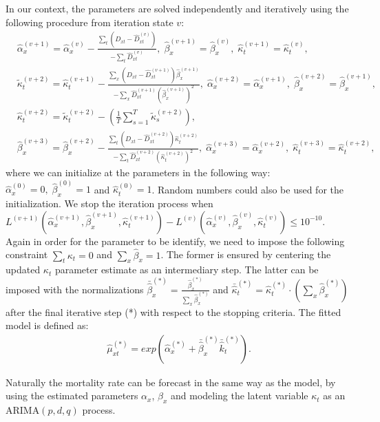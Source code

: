\documentclass[AER, draftmode]{AEA}
\begin{document}
In our context, the parameters are solved independently and iteratively using the following procedure from iteration state $v$:
\begin{align}
&\hat{\alpha}_x^{(v+1)}=\hat{\alpha}_x^{(v)}-\frac{\sum_t (D_{xt}-\hat{D}_{xt}^{(v)})}{-\sum_t\hat{D}_{xt}^{(v)}},\;\hat{\beta}_x^{(v+1)}=\hat{\beta}_x^{(v)},\;\hat{\kappa}_t^{(v+1)}=\hat{\kappa}_t^{(v)},\\
&\tilde{\kappa}_t^{(v+2)}=\hat{\kappa}_t^{(v+1)}-\frac{\sum_x(D_{xt}-\hat{D}_{xt}^{(v+1)})\hat{\beta}_x^{(v+1)}}{-\sum_x\hat{D}_{xt}^{(v+1)}(\hat{\beta}_x^{(v+1)})^2},\;\hat{\alpha}_x^{(v+2)}=\hat{\alpha}_x^{(v+1)},\;\hat{\beta}_x^{(v+2)}=\hat{\beta}_x^{(v+1)},\\
&\hat{\kappa}_t^{(v+2)}=\tilde{\kappa}_t^{(v+2)}-(\frac{1}{T}\sum_{s=1}^{T}\tilde{\kappa}_s^{(v+2)}),\\
&\hat{\beta}_x^{(v+3)}=\hat{\beta}_x^{(v+2)}-\frac{\sum_t (D_{xt}-\hat{D}_{xt}^{(v+2)})\hat{\kappa}_t^{(v+2)}}{-\sum_t\hat{D}_{xt}^{(v+2)}(\hat{\kappa}_t^{(v+2)})^2},\;\hat{\alpha}_x^{(v+3)}=\hat{\alpha}_x^{(v+2)},\;\hat{\kappa}_t^{(v+3)}=\hat{\kappa}_t^{(v+2)},
\end{align}
where we can initialize at the parameters in the following way: $\hat{\alpha}_x^{(0)}=0,\;\hat{\beta}_x^{(0)}=1$ and $\hat{\kappa}_t^{(0)}=1$. Random numbers could also be used for the initialization. We stop the iteration process when $L^{(v+1)}(\hat{\alpha}_x^{(v+1)},\hat{\beta}_x^{(v+1)},\hat{\kappa}_t^{(v+1)})-L^{(v)}(\hat{\alpha}_x^{(v)},\hat{\beta}_x^{(v)},\hat{\kappa}_t^{(v)})\leq 10^{-10}$. Again in order for the parameter to be identify, we need to impose the following constraint $\sum_t\kappa_t=0$ and $\sum_x\hat{\beta}_x=1$. The former is ensured by centering the updated $\kappa_t$ parameter estimate as an intermediary step. The latter can be imposed with the normalizations $\bar{\hat{\beta}}_x^{(*)}=\frac{\hat{\beta}_x^{(*)}}{\sum_x\hat{\beta}_x^{(*)}} $ and $\bar{\hat{\kappa}}_t^{(*)}=\hat{\kappa}_t^{(*)}\cdot (\sum_x\hat{\beta}_x^{(*)})$ after the final iterative step (*) with respect to the stopping criteria. The fitted model is defined as:
\begin{align}
\hat{\mu}_{xt}^{(*)}=exp(\hat{\alpha}_x^{(*)}+\bar{\hat{\beta}}_x^{(*)}\bar{\hat{k}}_t^{(*)}).
\end{align}

Naturally the mortality rate can be forecast in the same way as the \cite{Lee1992} model, by using the estimated parameters $\alpha_x$, $\beta_x$ and modeling the latent variable $\kappa_t$ as an ARIMA$(p,d,q)$ process.
\end{document}
